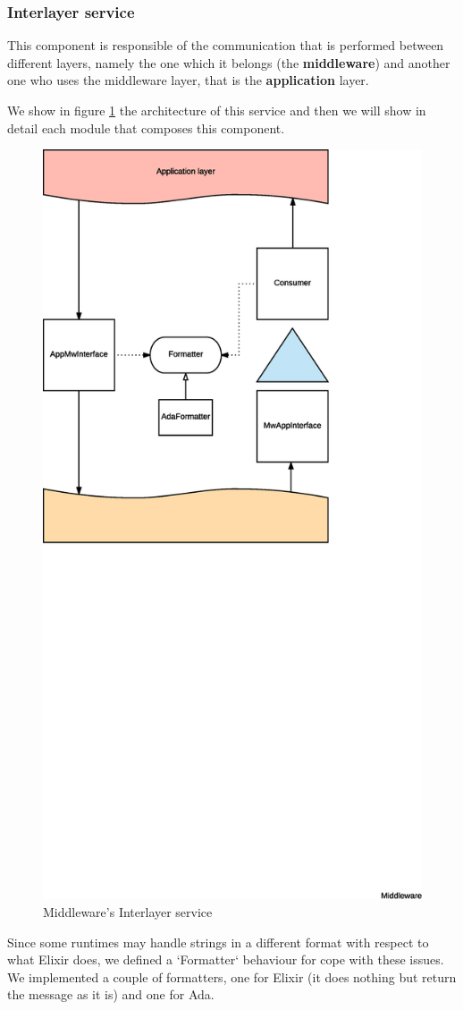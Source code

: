 \subsubsection{Interlayer service}

This component is responsible of the communication that is performed between
different layers, namely the one which it belongs (the \textbf{middleware}) and
another one who uses the middleware layer, that is the \textbf{application}
layer.

We show in figure \ref{fig:mw-interlayer} the architecture of this service and
then we will show in detail each module that composes this component.

\begin{figure}[H]
  \centering
  \includegraphics[width=.8\columnwidth, trim={0 20cm 0 0}]{images/solution/mw/int/architect.eps}
  \caption{Middleware's Interlayer service}
  \label{fig:mw-interlayer}
\end{figure}

Since some runtimes may handle strings in a different format with respect to
what Elixir does, we defined a `Formatter` behaviour for cope with these issues.
We implemented a couple of formatters, one for Elixir (it does nothing but
return the message as it is) and one for Ada.

